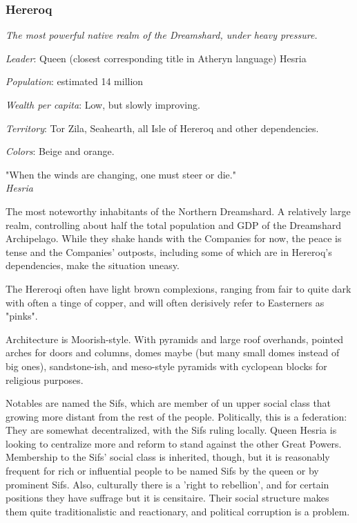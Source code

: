 \subsubsection{Hereroq}


\textit{The most powerful native realm of the Dreamshard, under heavy pressure.}


\textit{Leader}: Queen (closest corresponding title in Atheryn language) Hesria

\textit{Population}: estimated 14 million

\textit{Wealth per capita}: Low, but slowly improving.

\textit{Territory}: Tor Zila, Seahearth, all Isle of Hereroq and other dependencies.
    
\textit{Colors}: Beige and orange.


\begin{rpg-quotebox}
    "When the winds are changing, one must steer or die." \\ \textendash \textit{Hesria}
\end{rpg-quotebox}


The most noteworthy inhabitants of the Northern Dreamshard. A relatively large realm, controlling about half the total population and GDP of the Dreamshard Archipelago. While they shake hands with the Companies for now, the peace is tense and the Companies' outposts, including some of which are in Hereroq's dependencies, make the situation uneasy.

The Hereroqi often have light brown complexions, ranging from fair to quite dark with often a tinge of copper, and will often derisively refer to Easterners as "pinks".





Architecture is Moorish-style. With pyramids and large roof overhands, pointed arches for doors and columns, domes maybe (but many small domes instead of big ones), sandstone-ish, and meso-style pyramids with cyclopean blocks for religious purposes.

Notables are named the Sifs, which are member of un upper social class that growing more distant from the rest of the people. Politically, this is a federation: They are somewhat decentralized, with the Sifs ruling locally. Queen Hesria is looking to centralize more and reform to stand against the other Great Powers. Membership to the Sifs' social class is inherited, though, but it is reasonably frequent for rich or influential people to be named Sifs by the queen or by prominent Sifs. Also, culturally there is a 'right to rebellion', and for certain positions they have suffrage but it is censitaire. Their social structure makes them quite traditionalistic and reactionary, and political corruption is a problem.



